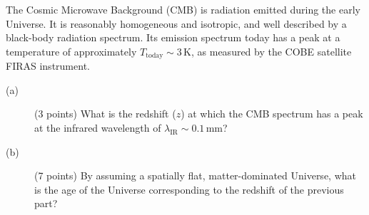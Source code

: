 The Cosmic Microwave Background (CMB) is radiation emitted during the early
Universe. It is reasonably homogeneous and isotropic, and well described by a
black-body radiation spectrum. Its emission spectrum today has a peak at a
temperature of approximately $T_{\mathrm{today}} \sim 3$\,K, as measured by
the COBE satellite FIRAS instrument.

\begin{description}
\item[(a)] (3 points) What is the redshift ($z$) at which the CMB spectrum has
  a peak at the infrared wavelength of
  $\lambda_{\mathrm{IR}} \sim 0.1$\,mm?
\item[(b)] (7 points) By assuming a spatially flat, matter-dominated Universe,
  what is the age of the Universe corresponding to the redshift of the
  previous part?
\end{description}
